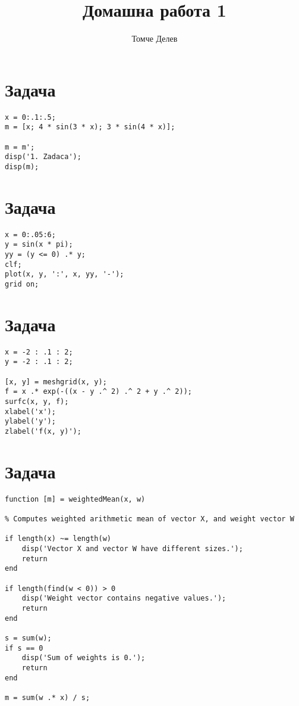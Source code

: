 \documentclass{article}
\begin{document}
\title{Домашна работа 1}
\author{Томче Делев}
\date{}

\maketitle

\section{Задача}
\begin{verbatim}
x = 0:.1:.5;
m = [x; 4 * sin(3 * x); 3 * sin(4 * x)];

m = m';
disp('1. Zadaca');
disp(m);
\end{verbatim}

\section{Задача}
\begin{verbatim}
x = 0:.05:6;
y = sin(x * pi);
yy = (y <= 0) .* y;
clf;
plot(x, y, ':', x, yy, '-');
grid on;
\end{verbatim}

\section{Задача}
\begin{verbatim}
x = -2 : .1 : 2;
y = -2 : .1 : 2;

[x, y] = meshgrid(x, y);
f = x .* exp(-((x - y .^ 2) .^ 2 + y .^ 2));
surfc(x, y, f);
xlabel('x');
ylabel('y');
zlabel('f(x, y)');
\end{verbatim}

\section{Задача}
\begin{verbatim}
function [m] = weightedMean(x, w)

% Computes weighted arithmetic mean of vector X, and weight vector W

if length(x) ~= length(w)
    disp('Vector X and vector W have different sizes.');
    return
end

if length(find(w < 0)) > 0
    disp('Weight vector contains negative values.');
    return
end

s = sum(w);
if s == 0
    disp('Sum of weights is 0.');
    return
end

m = sum(w .* x) / s;
\end{verbatim}
\end{document}
